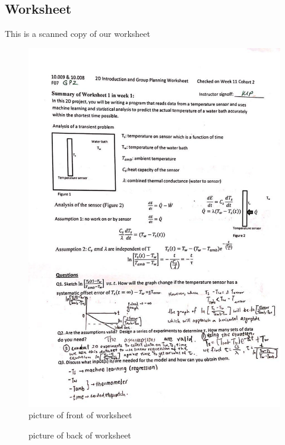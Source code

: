 \documentclass[10pt]{article}
\begin{document}
\begin{appendices}
\section{Worksheet}
This is a scanned copy of our worksheet
\begin{figure}[bp!]
\caption{picture of front of worksheet}
\includegraphics[scale=0.9]{9}
\end{figure}
\begin{figure}[bp!]
\caption{picture of back of worksheet}

\end{figure}
\end{appendices}
\end{document}
